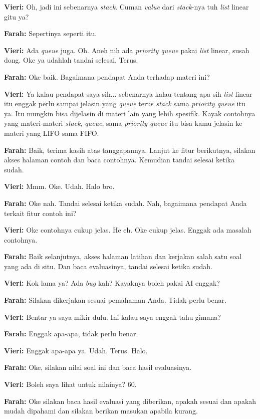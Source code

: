\textbf{Vieri:} Oh, jadi ini sebenarnya \textit{stack}. Cuman \textit{value} dari \textit{stack}-nya tuh \textit{list} linear gitu ya?

\textbf{Farah:} Sepertinya seperti itu.

\textbf{Vieri:} Ada \textit{queue} juga. Oh. Aneh nih ada \textit{priority queue} pakai \textit{list} linear, susah dong. Oke ya udahlah tandai selesai. Terus.

\textbf{Farah:} Oke baik. Bagaimana pendapat Anda terhadap materi ini?

\textbf{Vieri:} Ya kalau pendapat saya sih... sebenarnya kalau tentang apa sih \textit{list} linear itu enggak perlu sampai jelasin yang \textit{queue} terus \textit{stack} sama \textit{priority queue} itu ya. Itu mungkin bisa dijelasin di materi lain yang lebih spesifik. Kayak contohnya yang materi-materi \textit{stack}, \textit{queue}, sama \textit{priority queue} itu bisa kamu jelasin ke materi yang LIFO sama FIFO.

\textbf{Farah:} Baik, terima kasih atas tanggapannya. Lanjut ke fitur berikutnya, silakan akses halaman contoh dan baca contohnya. Kemudian tandai selesai ketika sudah.

\textbf{Vieri:} Mmm. Oke. Udah. Halo bro.

\textbf{Farah:} Oke nah. Tandai selesai ketika sudah. Nah, bagaimana pendapat Anda terkait fitur contoh ini?

\textbf{Vieri:} Oke contohnya cukup jelas. He eh. Oke cukup jelas. Enggak ada masalah contohnya.

\textbf{Farah:} Baik selanjutnya, akses halaman latihan dan kerjakan salah satu soal yang ada di situ. Dan baca evaluasinya, tandai selesai ketika sudah.

\textbf{Vieri:} Kok lama ya? Ada \textit{bug} kah? Kayaknya boleh pakai AI enggak?

\textbf{Farah:} Silakan dikerjakan sesuai pemahaman Anda. Tidak perlu benar.

\textbf{Vieri:} Bentar ya saya mikir dulu. Ini kalau saya enggak tahu gimana?

\textbf{Farah:} Enggak apa-apa, tidak perlu benar.

\textbf{Vieri:} Enggak apa-apa ya. Udah. Terus. Halo.

\textbf{Farah:} Oke, silakan nilai soal ini dan baca hasil evaluasinya.

\textbf{Vieri:} Boleh saya lihat untuk nilainya? 60.

\textbf{Farah:} Oke silakan baca hasil evaluasi yang diberikan, apakah sesuai dan apakah mudah dipahami dan silakan berikan masukan apabila kurang.


